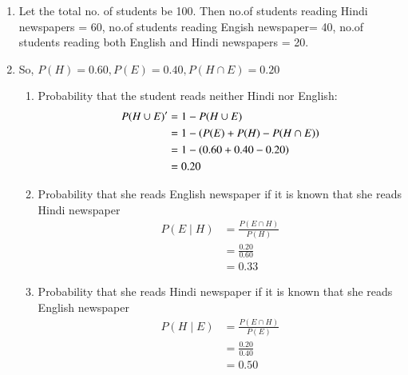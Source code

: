 \renewcommand{\theequation}{\theenumi}
\begin{enumerate}[label=\thesection.\arabic*.,ref=\thesection.\theenumi]
\item Let the total no. of students be 100. Then no.of students reading Hindi newspapers = 60, no.of students reading Engish newspaper= 40, no.of students reading both English and Hindi newspapers = 20.
\item So, $P(H)= 0.60, P(E)=0.40, P(H \cap E)=0.20$ 
\begin{enumerate}
\item Probability that the student reads neither Hindi nor English:
\begin{align}
P(H \cup E)' &= 1- P(H \cup E)\\
&= 1- \left(P(E)+P(H)-P(H \cap E)\right)\\
&= 1- \left(0.60+0.40-0.20\right)\\
&= 0.20
\end{align}
\item Probability that she reads English newspaper if it is known that she reads Hindi newspaper
\begin{align}
P(E \mid H) &= \frac{P(E \cap H)}{P(H)}\\
&= \frac{0.20}{0.60}\\
&= 0.33
\end{align}
\item Probability that she reads Hindi newspaper if it is known that she reads English newspaper
\begin{align}
P(H \mid E) &= \frac{P(E \cap H)}{P(E)}\\
&= \frac{0.20}{0.40}\\
&= 0.50
\end{align}
\end{enumerate}
\end{enumerate}